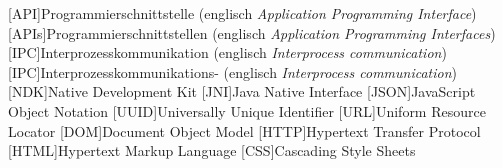 
\begin{acronym}
  [API]{Programmierschnittstelle (englisch \textit{Application Programming Interface})}
  [APIs]{Programmierschnittstellen (englisch \textit{Application Programming Interfaces})}
  [IPC]{Interprozesskommunikation (englisch \textit{Interprocess communication})}
  [IPC]{Interprozesskommunikations- (englisch \textit{Interprocess communication})}
  [NDK]{Native Development Kit}
  [JNI]{Java Native Interface}
  [JSON]{JavaScript Object Notation}
  [UUID]{Universally Unique Identifier}
  [URL]{Uniform Resource Locator}
  [DOM]{Document Object Model}
  [HTTP]{Hypertext Transfer Protocol}
  [HTML]{Hypertext Markup Language}
  [CSS]{Cascading Style Sheets}
\end{acronym}
